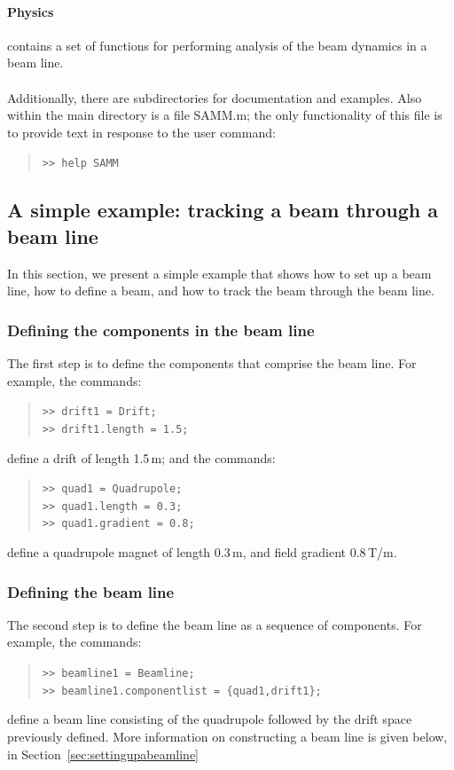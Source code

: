 \documentclass[11pt,twoside,a4paper]{article}
\begin{document}
\paragraph{Physics} contains a set of functions for performing analysis of
the beam dynamics in a beam line.
\paragraph{}

Additionally, there are subdirectories for documentation and examples.  Also within
the main directory is a file SAMM.m; the only functionality of this file is to
provide text in response to the user command:
\begin{quote}
\texttt{>> help SAMM}
\end{quote}

\subsection{A simple example: tracking a beam through a beam line\label{sec:simpleexample}}
In this section, we present a simple example that shows how to set up a beam line,
how to define a beam, and how to track the beam through the beam line.

\subsubsection{Defining the components in the beam line}
The first step is to define the components that comprise the beam line.
For example, the commands:
\begin{quote}
\texttt{>> drift1 = Drift; \\
>> drift1.length = 1.5;}
\end{quote}
define a drift of length 1.5\,m; and the commands:
\begin{quote}
\texttt{>> quad1 = Quadrupole; \\
>> quad1.length = 0.3; \\
>> quad1.gradient = 0.8;}
\end{quote}
define a quadrupole magnet of length 0.3\,m, and field gradient 0.8\,T/m.

\subsubsection{Defining the beam line}
The second step is to define the beam line as a sequence of components.
For example, the commands:
\begin{quote}
\texttt{>> beamline1 = Beamline; \\
>> beamline1.componentlist = \{quad1,drift1\};}
\end{quote}
define a beam line consisting of the quadrupole followed by the drift space
previously defined.  More information on constructing a beam line is given
below, in Section~\ref{sec:settingupabeamline}
\end{document}
